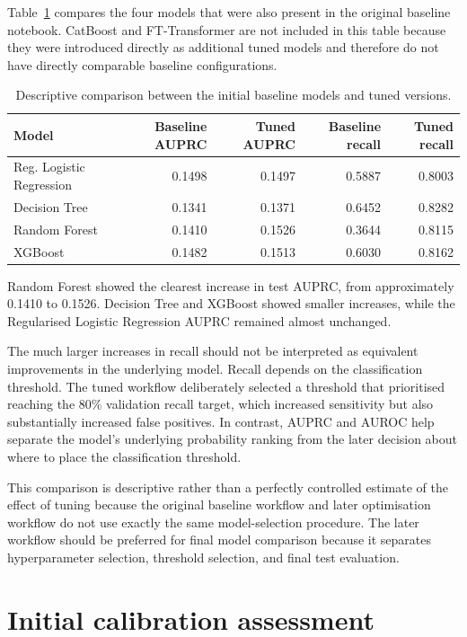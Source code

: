 \documentclass[11pt,a4paper]{article}
\begin{document}
Table~\ref{tab:baseline_comparison} compares the four models that were also present in the original baseline notebook. CatBoost and FT-Transformer are not included in this table because they were introduced directly as additional tuned models and therefore do not have directly comparable baseline configurations.

\begin{table}[htbp]
\centering
\caption{Descriptive comparison between the initial baseline models and tuned versions.}
\label{tab:baseline_comparison}
\begin{tabular}{lrrrr}
\toprule
Model & Baseline AUPRC & Tuned AUPRC & Baseline recall & Tuned recall \\
\midrule
Reg. Logistic Regression & 0.1498 & 0.1497 & 0.5887 & 0.8003 \\
Decision Tree             & 0.1341 & 0.1371 & 0.6452 & 0.8282 \\
Random Forest             & 0.1410 & 0.1526 & 0.3644 & 0.8115 \\
XGBoost                   & 0.1482 & 0.1513 & 0.6030 & 0.8162 \\
\bottomrule
\end{tabular}
\end{table}

Random Forest showed the clearest increase in test AUPRC, from approximately 0.1410 to 0.1526. Decision Tree and XGBoost showed smaller increases, while the Regularised Logistic Regression AUPRC remained almost unchanged.

The much larger increases in recall should not be interpreted as equivalent improvements in the underlying model. Recall depends on the classification threshold. The tuned workflow deliberately selected a threshold that prioritised reaching the 80\% validation recall target, which increased sensitivity but also substantially increased false positives. In contrast, AUPRC and AUROC help separate the model's underlying probability ranking from the later decision about where to place the classification threshold.

This comparison is descriptive rather than a perfectly controlled estimate of the effect of tuning because the original baseline workflow and later optimisation workflow do not use exactly the same model-selection procedure. The later workflow should be preferred for final model comparison because it separates hyperparameter selection, threshold selection, and final test evaluation.

\section{Initial calibration assessment}
\end{document}
